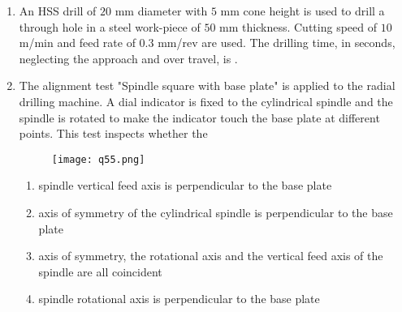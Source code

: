 \documentclass[journal,12pt,onecolumn]{IEEEtran}
\theoremstyle{remark}
\begin{document}
\begin{enumerate}
    \hfill{}

    \item An HSS drill of $20$ mm diameter with $5$ mm cone height is used to drill a through hole in a steel work-piece of $50$ mm thickness. Cutting speed of $10$ m/min and feed rate of $0.3$ mm/rev are used. The drilling time, in seconds, neglecting the approach and over travel, is \underline{\hspace{2cm}}.
    
    \hfill{}

    \item The alignment test "Spindle square with base plate" is applied to the radial drilling machine. A dial indicator is fixed to the cylindrical spindle and the spindle is rotated to make the indicator touch the base plate at different points. This test inspects whether the
    
    \begin{figure}[H]
        \centering
        \texttt{[image: q55.png]}
        \caption*{}
        \label{fig:q55}
    \end{figure}
    
    \hfill{}
    \begin{enumerate}
        \item spindle vertical feed axis is perpendicular to the base plate
        \item axis of symmetry of the cylindrical spindle is perpendicular to the base plate
        \item axis of symmetry, the rotational axis and the vertical feed axis of the spindle are all coincident
        \item spindle rotational axis is perpendicular to the base plate
    \end{enumerate}

\end{enumerate}
\end{document}
